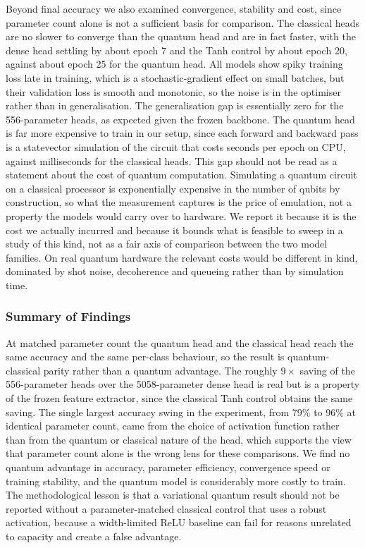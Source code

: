 Beyond final accuracy we also examined convergence, stability and cost, since
parameter count alone is not a sufficient basis for comparison. The classical heads
are no slower to converge than the quantum head and are in fact faster, with the
dense head settling by about epoch 7 and the Tanh control by about epoch 20, against
about epoch 25 for the quantum head. All models show spiky training loss late in
training, which is a stochastic-gradient effect on small batches, but their
validation loss is smooth and monotonic, so the noise is in the optimiser rather
than in generalisation. The generalisation gap is essentially zero for the
556-parameter heads, as expected given the frozen backbone. The quantum head is far
more expensive to train in our setup, since each forward and backward pass is a
statevector simulation of the circuit that costs seconds per epoch on CPU, against
milliseconds for the classical heads. This gap should not be read as a statement about
the cost of quantum computation. Simulating a quantum circuit on a classical processor
is exponentially expensive in the number of qubits by construction, so what the
measurement captures is the price of emulation, not a property the models would carry
over to hardware. We report it because it is the cost we actually incurred and because
it bounds what is feasible to sweep in a study of this kind, not as a fair axis of
comparison between the two model families. On real quantum hardware the relevant costs
would be different in kind, dominated by shot noise, decoherence and queueing rather
than by simulation time.

\subsubsection{Summary of Findings}

At matched parameter count the quantum head and the classical head reach the same
accuracy and the same per-class behaviour, so the result is quantum-classical parity
rather than a quantum advantage. The roughly $9\times$ saving of the 556-parameter
heads over the 5058-parameter dense head is real but is a property of the frozen
feature extractor, since the classical Tanh control obtains the same saving. The
single largest accuracy swing in the experiment, from 79\% to 96\% at identical
parameter count, came from the choice of activation function rather than from the
quantum or classical nature of the head, which supports the view that parameter
count alone is the wrong lens for these comparisons. We find no quantum advantage in
accuracy, parameter efficiency, convergence speed or training stability, and the
quantum model is considerably more costly to train. The methodological lesson is
that a variational quantum result should not be reported without a parameter-matched
classical control that uses a robust activation, because a width-limited ReLU
baseline can fail for reasons unrelated to capacity and create a false advantage.

